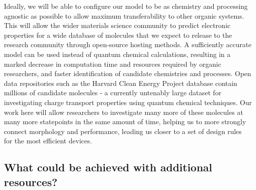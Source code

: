 \documentclass[12pt]{article}
\begin{document}
Ideally, we will be able to configure our model to be as chemistry and processing agnostic as possible to allow maximum transferability to other organic systems.
This will allow the wider materials science community to predict electronic properties for a wide database of molecules that we expect to release to the research community through open-source hosting methods.
A sufficiently accurate model can be used instead of quantum chemical calculations, resulting in a marked decrease in computation time and resources required by organic researchers, and faster identification of candidate chemistries and processes.
Open data repositories such as the Harvard Clean Energy Project database contain millions of candidate molecules - a currently untenably large dataset for investigating charge transport properties using quantum chemical techniques.
Our work here will allow researchers to investigate many more of these molecules at many more statepoints in the same amount of time, helping us to more strongly connect morphology and performance, leading us closer to a set of design rules for the most efficient devices.


\subsection{What could be achieved with additional resources?}
\end{document}
